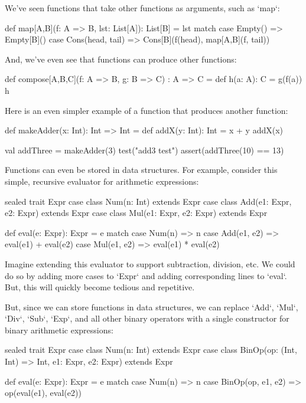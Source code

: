 \documentclass{book}
\begin{document}
We've seen functions that take other functions as arguments, such as `map`:

\begin{scalacode}
def map[A,B](f: A => B, lst: List[A]): List[B] = lst match {
  case Empty() => Empty[B]()
  case Cons(head, tail) => Cons[B](f(head), map[A,B](f, tail))
}
\end{scalacode}

And, we've even see that functions can produce other functions:

\begin{scalacode}
def compose[A,B,C](f: A => B, g: B => C) : A => C = {
  def h(a: A): C = { g(f(a)) }
  h
}
\end{scalacode}

Here is an even simpler example of a function that produces another function:

\begin{scalacode}
def makeAdder(x: Int): Int => Int = {
  def addX(y: Int): Int = x + y
  addX(x)
}

val addThree = makeAdder(3)
test("add3 test") {
  assert(addThree(10) == 13)
}
\end{scalacode}

Functions can even be stored in data structures. For example, consider
this simple, recursive evaluator for arithmetic expressions:

\begin{scalacode}
sealed trait Expr
case class Num(n: Int) extends Expr
case class Add(e1: Expr, e2: Expr) extends Expr
case class Mul(e1: Expr, e2: Expr) extends Expr

def eval(e: Expr): Expr = e match {
  case Num(n) => n
  case Add(e1, e2) => eval(e1) + eval(e2)
  case Mul(e1, e2) => eval(e1) * eval(e2)
}
\end{scalacode}

Imagine extending this evaluator to support subtraction, division, etc.
We could do so by adding more cases to `Expr` and adding corresponding
lines to `eval`. But, this will quickly become tedious and repetitive.

But, since we can store functions in data structures, we can replace
`Add`, `Mul`, `Div`, `Sub`, `Exp`, and all other binary operators with
a single constructor for binary arithmetic expressions:

\begin{scalacode}
sealed trait Expr
case class Num(n: Int) extends Expr
case class BinOp(op: (Int, Int) => Int, e1: Expr, e2: Expr) extends Expr

def eval(e: Expr): Expr = e match {
  case Num(n) => n
  case BinOp(op, e1, e2) => op(eval(e1), eval(e2))
}
\end{scalacode}
\end{document}
